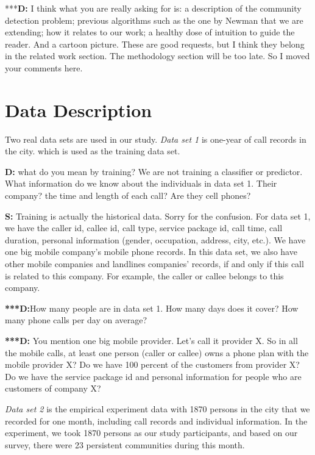 \documentclass{article}
\begin{document}
***\textbf{D:} I think what you are really asking for is: a description of the community detection problem; previous algorithms such as the one by Newman that we are extending; how it relates to our work; a healthy dose of intuition to guide the reader. And a cartoon picture. These are good requests, but I think they belong in the related work section. The methodology section will be too late. So I moved your comments here.

\section{Data Description}

Two real data sets are used in our study. \textit{Data set 1} is one-year of call records in the city. which is used as the
training data set. 

\textbf{D:} what do you mean by training? We are not training a classifier or predictor. What information do we know about the individuals in data set 1. Their company? the time and length of each call? Are they cell phones? 

\textbf{S:} Training is actually the historical data. Sorry for the confusion. For data set 1, we have the caller id, callee id, call type, service package id, call time, call duration, personal information (gender, occupation, address, city, etc.). We have one big mobile company's mobile phone records. In this data set, we also have other mobile companies and landlines companies' records, if and only if this call is related to this company. For example, the caller or callee belongs to this company.

\textbf{***D:}How many people are in data set 1. How many days does it cover? How many phone calls per day on average?

\textbf{***D:} You mention one big mobile provider. Let's call it provider X. So in all the mobile calls, at least one person (caller or callee) owns a phone plan with the mobile provider X? Do we have 100 percent of the customers from provider X? Do we have the service package id and personal information for people who are customers of company X?

\textit{Data set 2} is the empirical experiment data with 1870 persons
in the city that we recorded for one month, including call records and individual information. In the experiment, we
took 1870 persons as our study participants, and based on our survey, there were 23 persistent communities during this month.
\end{document}
